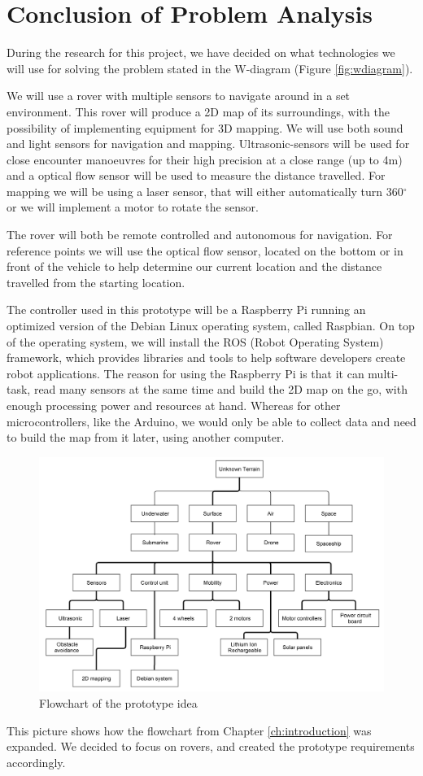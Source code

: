\section{Conclusion of Problem Analysis}

During the research for this project, we have decided on what technologies we will use for solving the problem stated in the W-diagram (Figure \ref{fig:wdiagram}).

We will use a rover with multiple sensors to navigate around in a set environment. This rover will produce a 2D map of its surroundings, with the possibility of implementing equipment for 3D mapping. We will use both sound and light sensors for navigation and mapping. Ultrasonic-sensors will be used for close encounter manoeuvres for their high precision at a close range (up to 4m)\cite{hcsr40datesheet} and a optical flow sensor will be used to measure the distance travelled. For mapping we will be using a laser sensor, that will either automatically turn 360$^{\circ}$ or we will implement a motor to rotate the sensor.

The rover will both be remote controlled and autonomous for navigation. For reference points we will use the optical flow sensor, located on the bottom or in front of the vehicle to help determine our current location and the distance travelled from the starting location.

The controller used in this prototype will be a Raspberry Pi running an optimized version of the Debian Linux operating system, called Raspbian. On top of the operating system, we will install the ROS (Robot Operating System) framework, which provides libraries and tools to help software developers create robot applications\cite{ros}.
The reason for using the Raspberry Pi is that it can multi-task, read many sensors at the same time and build the 2D map on the go, with enough processing power and resources at hand. Whereas for other microcontrollers, like the Arduino, we would only be able to collect data and need to build the map from it later, using another computer.

\begin{figure}[H]
	\centering
	\includegraphics[scale=.1]{images/level3.png}
	\caption{Flowchart of the prototype idea}
	\label{fig:level3}
\end{figure}

This picture shows how the flowchart from Chapter \ref{ch:introduction} was expanded. We decided to focus on rovers, and created the prototype requirements accordingly.

\clearpage
